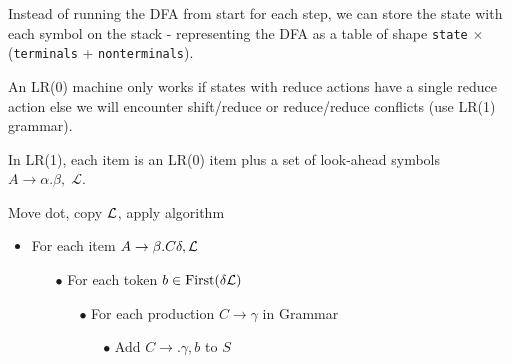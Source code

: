 Instead of running the DFA from start for each step, we can store the state with each symbol on the stack - representing the DFA as a table of shape \texttt{state} $\times$ (\texttt{terminals} + \texttt{nonterminals}). \medskip

An LR(0) machine only works if states with reduce actions have a single reduce action else we will encounter shift/reduce or reduce/reduce conflicts (use LR(1) grammar). \medskip

In LR(1), each item is an LR(0) item plus a set of look-ahead symbols $A \to \alpha . \beta, \; \mathcal L$.\medskip

\begin{algorithm} Move dot, copy $\mathcal{L}$, apply algorithm
   \begin{itemize}
       \item For each item $A \to \beta . C \delta, \mathcal{L}$
        \begin{itemize}
            \item[$\bullet$] For each token $b \in \operatorname{First}(\delta \mathcal{L})$
            \begin{itemize}
                \item[$\bullet$] For each production $C \to \gamma$ in Grammar
                \begin{itemize}
                    \item[$\bullet$] Add $C \to .\gamma, b$ to $S$
                \end{itemize}
            \end{itemize}
        \end{itemize}
   \end{itemize}
\end{algorithm}

